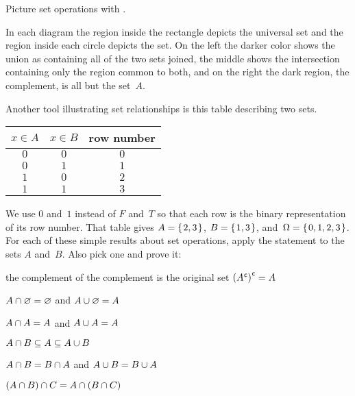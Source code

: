\documentclass{ibl}  %
\begin{document}
Picture set operations with .
\begin{center}
  \hspace*{3em}
  \hspace*{3em}
\end{center}
In each diagram
the region inside the rectangle depicts the universal set and the 
region inside each circle depicts the set.
On the left the darker color shows 
the union as containing all of the two sets joined, 
the middle shows the intersection
containing only the region common to both,
and on the right the dark region, the complement, is all but the set~$A$.

\begin{problem}
Another tool illustrating set relationships is this table describing 
two sets.
\begin{center} \small
  \begin{tabular}{cc|c}
    $x\in A$  &$x\in B$  &row number \\ \hline
    $0$       &$0$       &$0$  \\
    $0$       &$1$       &$1$  \\
    $1$       &$0$       &$2$  \\
    $1$       &$1$       &$3$  
  \end{tabular}
\end{center}
We use $0$ and~$1$ instead of $F$ and~$T$ so that each
row is the binary representation of its row number.
That table gives $A=\mbox{$\{\hspace{0.1em}2,3\hspace{0.1em}\}$}$, $B=\mbox{$\{\hspace{0.1em}1,3\hspace{0.1em}\}$}$, 
and~$\Omega=\mbox{$\{\hspace{0.1em}0,1,2,3\hspace{0.1em}\}$}$.
For each of these simple results about set operations, 
apply the statement to the sets $A$ and~$B$.
Also pick one and prove it:
\begin{items}
\item the complement of the complement is the original set
  ${({A}^{\mspace{1mu}\mathsf{c}})}^{\mspace{1mu}\mathsf{c}}=A$  
\item $A\cap\varnothing=\varnothing$ and $A\cup\varnothing=A$  
\item {} $A\cap A=A$ and $A\cup A=A$    
\item $A\cap B\subseteq A\subseteq A\cup B$  
\item {}
   $A\cap B=B\cap A$ and
   $A\cup B=B\cup A$ 
\item {} 
  $(A\cap B)\cap C=A\cap (B\cap C)$

\end{items}
\end{problem}
\end{document}
